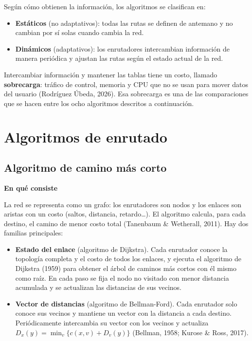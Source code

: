 \documentclass[12pt,letterpaper]{article}
\newcommand{\rub}[1]{\par\medskip\noindent\textbf{#1}\par\nopagebreak}
\begin{document}
Según cómo obtienen la información, los algoritmos se clasifican en:
\begin{itemize}[itemsep=2pt]
\item \textbf{Estáticos} (no adaptativos): todas las rutas se definen de antemano y no cambian por sí solas cuando cambia la red.
\item \textbf{Dinámicos} (adaptativos): los enrutadores intercambian información de manera periódica y ajustan las rutas según el estado actual de la red.
\end{itemize}
Intercambiar información y mantener las tablas tiene un costo, llamado \textbf{sobrecarga}: tráfico de control, memoria y CPU que no se usan para mover datos del usuario (Rodríguez Úbeda, 2026). Esa sobrecarga es una de las comparaciones que se hacen entre los ocho algoritmos descritos a continuación.

\section{Algoritmos de enrutado}

\subsection{Algoritmo de camino más corto}
\rub{En qué consiste}
La red se representa como un grafo: los enrutadores son nodos y los enlaces son aristas con un costo (saltos, distancia, retardo\ldots). El algoritmo calcula, para cada destino, el camino de menor costo total (Tanenbaum \& Wetherall, 2011). Hay dos familias principales:
\begin{itemize}[itemsep=3pt]
\item \textbf{Estado del enlace} (algoritmo de Dijkstra). Cada enrutador conoce la topología completa y el costo de todos los enlaces, y ejecuta el algoritmo de Dijkstra (1959) para obtener el árbol de caminos más cortos con él mismo como raíz. En cada paso se fija el nodo no visitado con menor distancia acumulada y se actualizan las distancias de sus vecinos.
\item \textbf{Vector de distancias} (algoritmo de Bellman-Ford). Cada enrutador solo conoce sus vecinos y mantiene un vector con la distancia a cada destino. Periódicamente intercambia su vector con los vecinos y actualiza $D_x(y) = \min_v \{c(x,v) + D_v(y)\}$ (Bellman, 1958; Kurose \& Ross, 2017).
\end{itemize}
\end{document}
